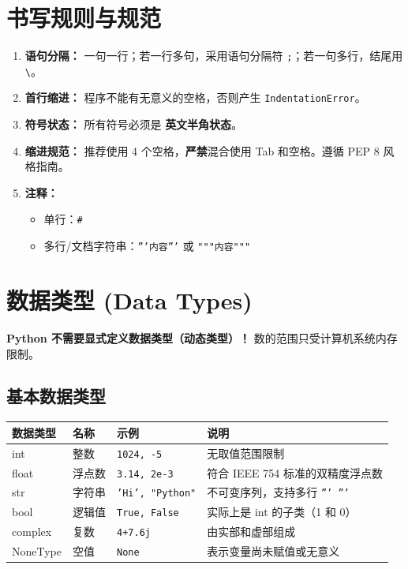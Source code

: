 \documentclass{article}
\begin{document}
\section{书写规则与规范}
\begin{enumerate}
    \item \textbf{语句分隔：} 一句一行；若一行多句，采用语句分隔符 \texttt{;}；若一句多行，结尾用 \texttt{\textbackslash}。
    \item \textbf{首行缩进：} 程序不能有无意义的空格，否则产生 \texttt{IndentationError}。
    \item \textbf{符号状态：} 所有符号必须是 \textbf{英文半角状态}。
    \item \textbf{缩进规范：} 推荐使用 4 个空格，\textbf{严禁}混合使用 Tab 和空格。遵循 PEP 8 风格指南。
    \item \textbf{注释：} 
    \begin{itemize}
        \item 单行：\texttt{\#}
        \item 多行/文档字符串：\texttt{'''内容'''} 或 \texttt{"""内容"""}
    \end{itemize}
\end{enumerate}

\section{数据类型 (Data Types)}
{\color{red} \textbf{Python 不需要显式定义数据类型（动态类型）！}} 数的范围只受计算机系统内存限制。

\subsection{基本数据类型}


\begin{table}[h]
\centering
\begin{tabular}{lllp{6cm}}
\toprule
\textbf{数据类型} & \textbf{名称} & \textbf{示例} & \textbf{说明} \\
\midrule
int & 整数 & \texttt{1024, -5} & 无取值范围限制 \\
float & 浮点数 & \texttt{3.14, 2e-3} & 符合 IEEE 754 标准的双精度浮点数 \\
str & 字符串 & \texttt{'Hi', "Python"} & 不可变序列，支持多行 \texttt{''' '''} \\
bool & 逻辑值 & \texttt{True, False} & 实际上是 int 的子类（1 和 0） \\
complex & 复数 & \texttt{4+7.6j} & 由实部和虚部组成 \\
NoneType & 空值 & \texttt{None} & 表示变量尚未赋值或无意义 \\
\bottomrule
\end{tabular}
\end{table}
\end{document}
